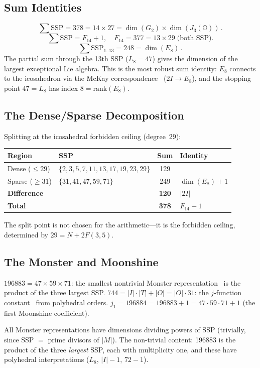 \documentclass[11pt,letterpaper]{article}
\theoremstyle{definition}
\newcommand{\SSP}{\mathrm{SSP}}
\newcommand{\OO}{\mathbb{O}}
\newcommand{\abs}[1]{\lvert #1 \rvert}
\begin{document}
\subsection{Sum Identities}
\[
  \textstyle\sum\SSP = 378 = 14\times27 = \dim(G_2)\times\dim(J_3(\OO))\,.
\]
\[
  \textstyle\sum\SSP = F_{14}+1,\quad F_{14}=377=13\times29\;\text{(both SSP)}.
\]
\[
  \textstyle\sum\SSP_{1..13} = 248 = \dim(E_8)\,.
\]
The partial sum through the 13th SSP ($L_8=47$) gives the dimension of the largest exceptional Lie algebra.  This is the most robust sum identity: $E_8$ connects to the icosahedron via the McKay correspondence~\cite{McKay1980} ($2I\to E_8$), and the stopping point $47=L_8$ has index $8=\mathrm{rank}(E_8)$.
\subsection{The Dense/Sparse Decomposition}
Splitting at the icosahedral forbidden ceiling (degree~29):
\medskip
\begin{center}
\begin{tabular}{llcl}
\toprule
Region & SSP & Sum & Identity \\
\midrule
Dense ($\le29$) & $\{2,3,5,7,11,13,17,19,23,29\}$ & 129 & \\
Sparse ($\ge31$) & $\{31,41,47,59,71\}$ & 249 & $\dim(E_8)+1$ \\
\textbf{Difference} & & \textbf{120} & $\abs{2I}$ \\
\textbf{Total} & & \textbf{378} & $F_{14}+1$ \\
\bottomrule
\end{tabular}
\end{center}
\medskip
The split point is not chosen for the arithmetic---it is the forbidden ceiling, determined by $29=N+2F(3,5)$.
\subsection{The Monster and Moonshine}\label{sec:monster}
$196883 = 47\times59\times71$: the smallest nontrivial Monster representation~\cite{ConwayNorton1979} is the product of the three largest SSP.
$744 = \abs{I}\cdot\abs{T}+\abs{O} = \abs{O}\cdot31$: the $j$-function constant~\cite{Klein1884} from polyhedral orders.
$j_1 = 196884 = 196883+1 = 47\cdot59\cdot71+1$ (the first Moonshine coefficient).
\begin{remarkbox}
All Monster representations have dimensions dividing powers of SSP (trivially, since SSP $=$ prime divisors of $\abs{M}$).  The non-trivial content: 196883 is the product of the three \emph{largest} SSP, each with multiplicity one, and these have polyhedral interpretations ($L_8$, $\abs{I}-1$, $72-1$).
\end{remarkbox}
\end{document}
